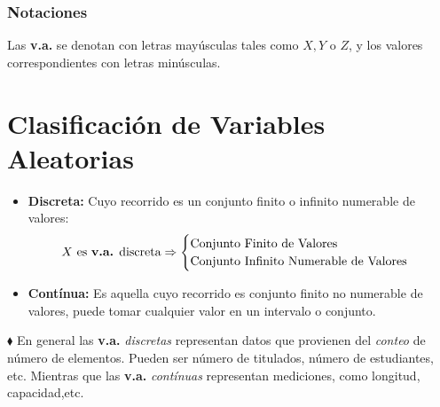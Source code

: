 \subsubsection{Notaciones}
Las \textbf{v.a.} se denotan con letras mayúsculas tales como $X,Y$ o $Z$, y los valores correspondientes con letras minúsculas.
\section{Clasificación de Variables Aleatorias}
\begin{itemize}
\item \textbf{Discreta:} Cuyo recorrido es un conjunto finito o infinito numerable de valores:
$$
X \text{ es \textbf{v.a.} discreta} \Rightarrow
\begin{cases}
\text{Conjunto Finito de Valores} \\
\text{Conjunto Infinito Numerable de Valores}
\end{cases}
$$
\item \textbf{Contínua:} Es aquella cuyo recorrido es conjunto finito no numerable de valores, puede tomar cualquier valor en un intervalo o conjunto.
\end{itemize}
$\blacklozenge$ En general las \textbf{v.a.} \textit{discretas} representan datos que provienen del \textit{conteo} de número de elementos. Pueden ser número de titulados, número de estudiantes, etc. Mientras que las \textbf{v.a.} \textit{contínuas} representan mediciones, como longitud, capacidad,etc.
